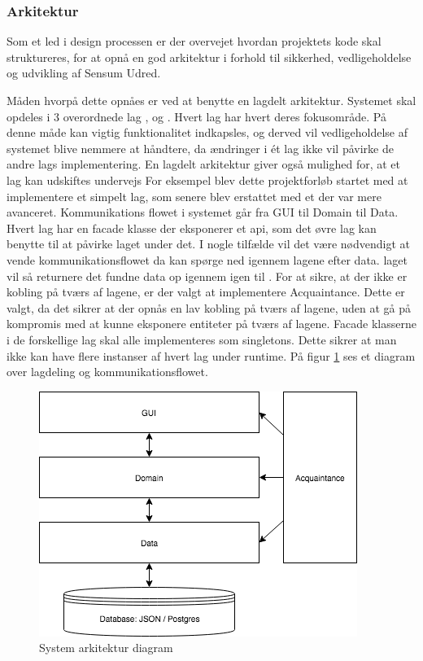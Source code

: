 \documentclass[../../main.tex]{subfiles}
\begin{document}
\subsubsection{Arkitektur} \label{arkitektur}
Som et led i design processen er der overvejet hvordan projektets kode skal struktureres, for at opnå en god arkitektur i forhold til sikkerhed, vedligeholdelse og udvikling af Sensum Udred.

Måden hvorpå dette opnåes er ved at benytte en lagdelt arkitektur. Systemet skal opdeles i 3 overordnede lag ,  og . Hvert lag har hvert deres fokusområde. På denne måde kan vigtig funktionalitet indkapsles, og derved vil vedligeholdelse af systemet blive nemmere at håndtere, da ændringer i ét lag ikke vil påvirke de andre lags implementering. En lagdelt arkitektur giver også mulighed for, at et lag kan udskiftes undervejs For eksempel blev dette projektforløb startet med at implementere et simpelt  lag, som senere blev erstattet med et der var mere avanceret. Kommunikations flowet i systemet går fra GUI til Domain til Data. Hvert lag har en facade klasse der eksponerer et api, som det øvre lag kan benytte til at påvirke laget under det. I nogle tilfælde vil det være nødvendigt at vende kommunikationsflowet da  kan spørge ned igennem lagene efter data.  laget vil så returnere det fundne data op igennem igen til . For at sikre, at der ikke er kobling på tværs af lagene, er der valgt at implementere Acquaintance. Dette er valgt, da det sikrer at der opnås en lav kobling på tværs af lagene, uden at gå på kompromis med at kunne eksponere entiteter på tværs af lagene. Facade klasserne i de forskellige lag skal alle implementeres som singletons. Dette sikrer at man ikke kan have flere instanser af hvert lag under runtime. På figur \ref{fig:arkitektur} ses et diagram over lagdeling  og kommunikationsflowet. \\

\begin{figure}[H]
  \centering
  \includegraphics[scale=.6]{figurer/arkitektur.png}
  \caption{System arkitektur diagram}
  \label{fig:arkitektur}
\end{figure}
\end{document}

